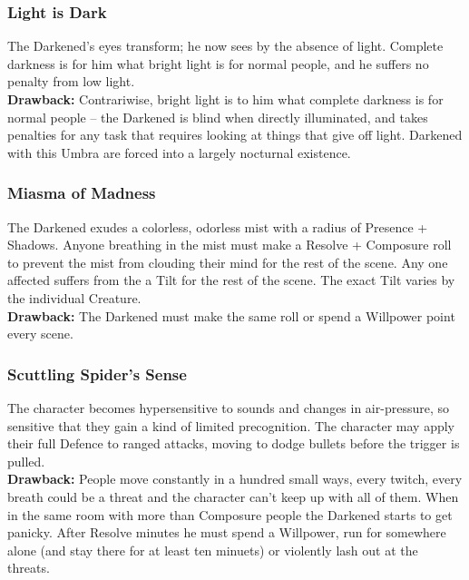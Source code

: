 \subsubsection*{Light is Dark}
The Darkened's eyes transform; he now sees by the absence of light. Complete darkness is for him what bright light is for normal people, and he suffers no penalty from low light. \\

\noindent \textbf{Drawback:} Contrariwise, bright light is to him what complete darkness is for normal people -- the Darkened is blind when directly illuminated, and takes penalties for any task that requires looking at things that give off light. Darkened with this Umbra are forced into a largely nocturnal existence. 

\subsubsection*{Miasma of Madness}
The Darkened exudes a colorless, odorless mist with a radius of Presence + Shadows. Anyone breathing in the mist must make a Resolve + Composure roll to prevent the mist from clouding their mind for the rest of the scene. Any one affected suffers from the a Tilt for the rest of the scene. The exact Tilt varies by the individual Creature. \\

\noindent \textbf{Drawback:} The Darkened must make the same roll or spend a Willpower point every scene. 

\subsubsection*{Scuttling Spider's Sense}

The character becomes hypersensitive to sounds and changes in air-pressure, so sensitive that they gain a kind of limited precognition. The character may apply their full Defence to ranged attacks, moving to dodge bullets before the trigger is pulled. \\

\noindent \textbf{Drawback:} People move constantly in a hundred small ways, every twitch, every breath could be a threat and the character can't keep up with all of them. When in the same room with more than Composure people the Darkened starts to get panicky. After Resolve minutes he must spend a Willpower, run for somewhere alone (and stay there for at least ten minuets) or violently lash out at the threats. 

